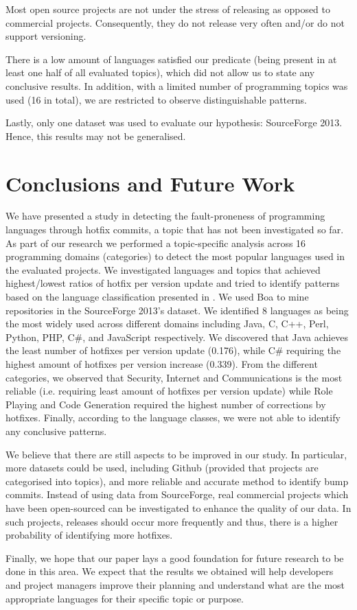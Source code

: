 \documentclass{sig-alternate}
\begin{document}
Most open source projects are not under the stress of releasing as opposed to commercial projects. Consequently, they do not release very often and/or do not support versioning.

There is a low amount of languages satisfied our predicate (being present in at least one half of all evaluated topics), which did not allow us to state any conclusive results. In addition, with a limited number of programming topics was used (16 in total), we are restricted to observe distinguishable patterns.

Lastly, only one dataset was used to evaluate our hypothesis: SourceForge 2013. Hence, this results may not be generalised.

\section{Conclusions and Future Work}
We have presented a study in detecting the fault-proneness of programming languages through hotfix commits, a topic that has not been investigated so far. As part of our research we performed a topic-specific analysis across 16 programming domains (categories) to detect the most popular languages used in the evaluated  projects. We investigated languages and topics that achieved highest/lowest ratios of hotfix per version update and tried to identify patterns based on the language classification presented in \cite{Ray2014}. We used Boa to mine repositories in the SourceForge 2013's dataset. %
We identified 8 languages as being the most widely used across different domains including Java, C, C++, Perl, Python, PHP, C\#, and JavaScript respectively. We discovered that Java achieves the least number of hotfixes per version update (0.176), while C\# requiring the highest amount of hotfixes per version increase (0.339). From the different categories, we observed that Security, Internet and Communications is the most reliable (i.e. requiring least amount of hotfixes per version update) while Role Playing and Code Generation required the highest number of corrections by hotfixes. Finally, according to the language classes, we were not able to identify any conclusive patterns.

We believe that there are still aspects to be improved in our study. In particular, more datasets could be used, including Github (provided that projects are categorised into topics), and more reliable and accurate method to identify bump commits. Instead of using data from SourceForge, real commercial projects which have been open-sourced can be investigated to enhance the quality of our data. In such projects, releases should occur more frequently and thus, there is a higher probability of identifying more hotfixes.

Finally, we hope that our paper lays a good foundation for future research to be done in this area. We expect that the results we obtained will help developers and project managers improve their planning and understand what are the most appropriate languages for their specific topic or purpose.


 

\end{document}
